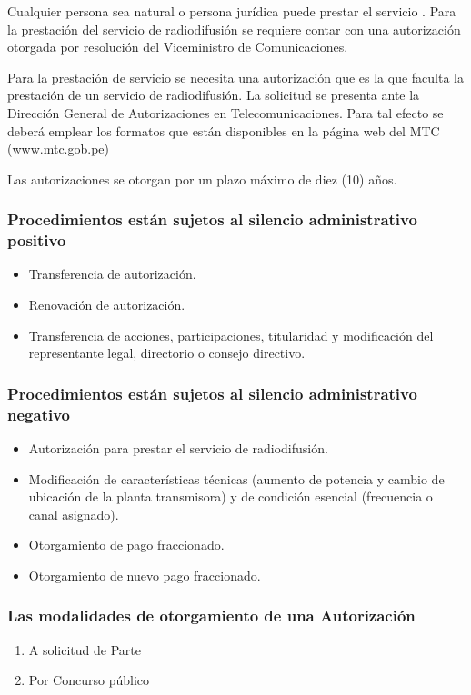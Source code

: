 \documentclass[11pt]{article}
\begin{document}
Cualquier persona sea natural o persona jurídica puede prestar el servicio . Para la prestación del servicio de radiodifusión se 
requiere  contar  con  una  autorización  otorgada 
por resolución del Viceministro de 
Comunicaciones.

Para la prestación de servicio se necesita una autorización que es la que faculta la prestación de un servicio de radiodifusión. La solicitud se presenta 
ante  la  Dirección  General  de  Autorizaciones  en 
Telecomunicaciones.  Para  tal  efecto  se  deberá 
emplear los formatos que están disponibles en la 
página web del MTC (www.mtc.gob.pe)

Las autorizaciones se otorgan por un plazo 
máximo de diez (10) años. 

\subsubsection{Procedimientos están sujetos al silencio  administrativo positivo}

\begin{itemize}
	\item Transferencia de autorización. 
	\item Renovación de autorización. 
	\item Transferencia de acciones, participaciones, 
	titularidad y modificación del representante 
	legal, directorio o consejo directivo.
\end{itemize}

\subsubsection{Procedimientos están sujetos al silencio administrativo negativo}
\begin{itemize}
	\item Autorización para prestar el servicio de 
	radiodifusión.
	\item Modificación de características técnicas 
	(aumento de potencia y cambio de ubicación de 
	la  planta  transmisora)  y  de  condición  esencial 
	(frecuencia o canal asignado). 
	\item Otorgamiento de pago fraccionado.
	\item Otorgamiento de nuevo pago fraccionado.
\end{itemize}

\subsubsection{Las modalidades de otorgamiento de una Autorización}
\begin{enumerate}
	\item A solicitud de Parte
	\item Por Concurso público
\end{enumerate}
\end{document}
